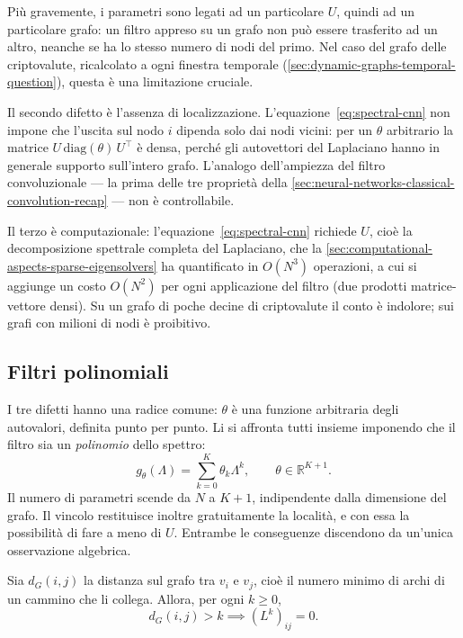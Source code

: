 Più gravemente, i parametri sono legati ad un particolare $U$, quindi ad un particolare grafo: un filtro appreso su un grafo non può essere trasferito ad un altro, neanche se ha lo stesso numero di nodi del primo. Nel caso del grafo delle criptovalute, ricalcolato a ogni finestra temporale (\cref{sec:dynamic-graphs-temporal-question}), questa è una limitazione cruciale.

Il secondo difetto è l'assenza di localizzazione. L'equazione~\eqref{eq:spectral-cnn} non impone che l'uscita sul nodo $i$ dipenda solo dai nodi vicini: per un $\theta$ arbitrario la matrice $U\,\mathrm{diag}(\theta)\,U^\top$ è densa, perché gli autovettori del Laplaciano hanno in generale supporto sull'intero grafo. L'analogo dell'ampiezza del filtro convoluzionale — la prima delle tre proprietà della \cref{sec:neural-networks-classical-convolution-recap} — non è controllabile.

Il terzo è computazionale: l'equazione~\eqref{eq:spectral-cnn} richiede $U$, cioè la decomposizione spettrale completa del Laplaciano, che la \cref{sec:computational-aspects-sparse-eigensolvers} ha quantificato in $O(N^3)$ operazioni, a cui si aggiunge un costo $O(N^2)$ per ogni applicazione del filtro (due prodotti matrice-vettore densi). Su un grafo di poche decine di criptovalute il conto è indolore; sui grafi con milioni di nodi è proibitivo.

\subsection{Filtri polinomiali}

I tre difetti hanno una radice comune: $\theta$ è una funzione arbitraria degli autovalori, definita punto per punto. Li si affronta tutti insieme imponendo che il filtro sia un \emph{polinomio} dello spettro:
\begin{equation}
\label{eq:polynomial-filter}
g_\theta(\Lambda) = \sum_{k=0}^{K}\theta_k\Lambda^k, \qquad \theta \in \mathbb{R}^{K+1}.
\end{equation}
Il numero di parametri scende da $N$ a $K+1$, indipendente dalla dimensione del grafo. Il vincolo restituisce inoltre gratuitamente la località, e con essa la possibilità di fare a meno di $U$. Entrambe le conseguenze discendono da un'unica osservazione algebrica.

\begin{proposition}
\label{prop:laplacian-powers-locality}
Sia $d_G(i,j)$ la distanza sul grafo tra $v_i$ e $v_j$, cioè il numero minimo di archi di un cammino che li collega. Allora, per ogni $k\geq0$,
$$d_G(i,j) > k \implies (L^k)_{ij} = 0.$$
\end{proposition}

